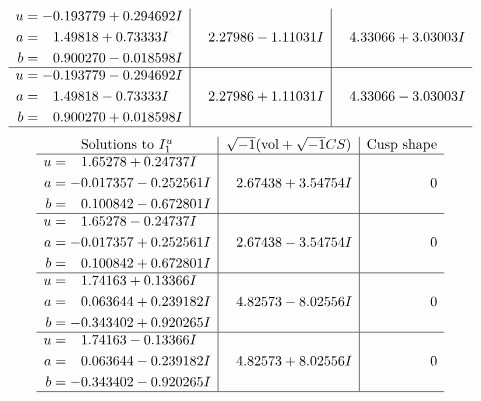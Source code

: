 \documentclass[1p]{elsarticle_modified}
\theoremstyle{definition}
\newcommand{\I}{\sqrt{-1}}
\begin{document}
$$\begin{array}{c|c|c}
\begin{aligned}
u &= -0.193779 + 0.294692 I \\
a &= \phantom{-}1.49818 + 0.73333 I \\
b &= \phantom{-}0.900270 - 0.018598 I\end{aligned}
 & \phantom{-}2.27986 - 1.11031 I & \phantom{-}4.33066 + 3.03003 I \\ \hline\begin{aligned}
u &= -0.193779 - 0.294692 I \\
a &= \phantom{-}1.49818 - 0.73333 I \\
b &= \phantom{-}0.900270 + 0.018598 I\end{aligned}
 & \phantom{-}2.27986 + 1.11031 I & \phantom{-}4.33066 - 3.03003 I\\
 \hline 
 \end{array}$$\newpage$$\begin{array}{c|c|c}  
\text{Solutions to }I^u_{1}& \I (\text{vol} + \sqrt{-1}CS) & \text{Cusp shape}\\
 \hline 
\begin{aligned}
u &= \phantom{-}1.65278 + 0.24737 I \\
a &= -0.017357 - 0.252561 I \\
b &= \phantom{-}0.100842 - 0.672801 I\end{aligned}
 & \phantom{-}2.67438 + 3.54754 I & \phantom{-0.000000 } 0 \\ \hline\begin{aligned}
u &= \phantom{-}1.65278 - 0.24737 I \\
a &= -0.017357 + 0.252561 I \\
b &= \phantom{-}0.100842 + 0.672801 I\end{aligned}
 & \phantom{-}2.67438 - 3.54754 I & \phantom{-0.000000 } 0 \\ \hline\begin{aligned}
u &= \phantom{-}1.74163 + 0.13366 I \\
a &= \phantom{-}0.063644 + 0.239182 I \\
b &= -0.343402 + 0.920265 I\end{aligned}
 & \phantom{-}4.82573 - 8.02556 I & \phantom{-0.000000 } 0 \\ \hline\begin{aligned}
u &= \phantom{-}1.74163 - 0.13366 I \\
a &= \phantom{-}0.063644 - 0.239182 I \\
b &= -0.343402 - 0.920265 I\end{aligned}
 & \phantom{-}4.82573 + 8.02556 I & \phantom{-0.000000 } 0\\
 \hline 
 \end{array}$$\newpage\newpage\renewcommand{\arraystretch}{1}
\end{document}
